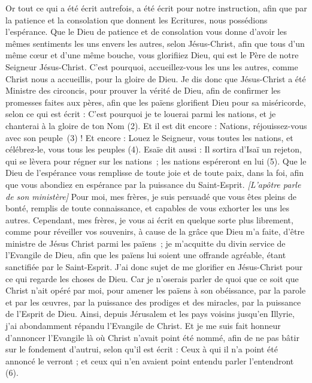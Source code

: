 \begin{multicols}{2}
Or tout ce qui a été écrit autrefois, a été écrit pour notre instruction, afin que par la patience et la consolation que donnent les Ecritures, nous possédions l’espérance.
Que le Dieu de patience et de consolation vous donne d’avoir les mêmes sentiments les uns envers les autres, selon Jésus-Christ,
afin que tous d'un même cœur et d'une même bouche, vous glorifiiez Dieu, qui est le Père de notre Seigneur Jésus-Christ.
C'est pourquoi, accueillez-vous les uns les autres, comme Christ nous a accueillis, pour la gloire de Dieu.
Je dis donc que Jésus-Christ a été Ministre des circoncis, pour prouver la vérité de Dieu, afin de confirmer les promesses faites aux pères,
afin que les païens glorifient Dieu pour sa miséricorde, selon ce qui est écrit : C’est pourquoi je te louerai parmi les nations, et je chanterai à la gloire de ton Nom (2). Et il est dit encore :
Nations, réjouissez-vous avec son peuple (3) !
Et encore : Louez le Seigneur, vous toutes les nations, et célébrez-le, vous tous les peuples (4). Esaïe dit aussi :
Il sortira d’Isaï un rejeton, qui se lèvera pour régner sur les nations ; les nations espéreront en lui (5).
Que le Dieu de l’espérance vous remplisse de toute joie et de toute paix, dans la foi, afin que vous abondiez en espérance par la puissance du Saint-Esprit.
\textit{[L'apôtre parle de son ministère]}
Pour moi, mes frères, je suis persuadé que vous êtes pleins de bonté, remplis de toute connaissance, et capables de vous exhorter les uns les autres.
Cependant, mes frères, je vous ai écrit en quelque sorte plus librement, comme pour réveiller vos souvenirs, à cause de la grâce que Dieu m’a faite,
d’être ministre de Jésus Christ parmi les païens ; je m’acquitte du divin service de l'Evangile de Dieu, afin que les païens lui soient une offrande agréable, étant sanctifiée par le Saint-Esprit.
J'ai donc sujet de me glorifier en Jésus-Christ pour ce qui regarde les choses de Dieu.
Car je n’oserais parler de quoi que ce soit que Christ n’ait opéré par moi, pour amener les païens à son obéissance, par la parole et par les œuvres,
par la puissance des prodiges et des miracles, par la puissance de l'Esprit de Dieu. Ainsi, depuis Jérusalem et les pays voisins jusqu’en Illyrie, j’ai abondamment répandu l’Evangile de Christ.
Et je me suis fait honneur d’annoncer l’Evangile là où Christ n’avait point été nommé, afin de ne pas bâtir sur le fondement d’autrui, selon qu'il est écrit :
Ceux à qui il n'a point été annoncé le verront ; et ceux qui n'en avaient point entendu parler l’entendront (6).

\end{multicols}
